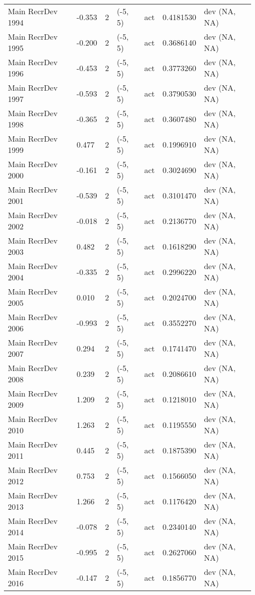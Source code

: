 \documentclass[11pt,
  english,
  letterpaper,
]{article}
\begin{document}
\begin{landscape}
\begin{longtable}[t]{>{\raggedright\arraybackslash}p{7cm}lllll>{\raggedright\arraybackslash}p{4cm}}
Main RecrDev 1994 & -0.353 & 2 & (-5, 5) & act & 0.4181530 & dev (NA, NA)\\
Main RecrDev 1995 & -0.200 & 2 & (-5, 5) & act & 0.3686140 & dev (NA, NA)\\
Main RecrDev 1996 & -0.453 & 2 & (-5, 5) & act & 0.3773260 & dev (NA, NA)\\
Main RecrDev 1997 & -0.593 & 2 & (-5, 5) & act & 0.3790530 & dev (NA, NA)\\
Main RecrDev 1998 & -0.365 & 2 & (-5, 5) & act & 0.3607480 & dev (NA, NA)\\
Main RecrDev 1999 & 0.477 & 2 & (-5, 5) & act & 0.1996910 & dev (NA, NA)\\
Main RecrDev 2000 & -0.161 & 2 & (-5, 5) & act & 0.3024690 & dev (NA, NA)\\
Main RecrDev 2001 & -0.539 & 2 & (-5, 5) & act & 0.3101470 & dev (NA, NA)\\
Main RecrDev 2002 & -0.018 & 2 & (-5, 5) & act & 0.2136770 & dev (NA, NA)\\
Main RecrDev 2003 & 0.482 & 2 & (-5, 5) & act & 0.1618290 & dev (NA, NA)\\
Main RecrDev 2004 & -0.335 & 2 & (-5, 5) & act & 0.2996220 & dev (NA, NA)\\
Main RecrDev 2005 & 0.010 & 2 & (-5, 5) & act & 0.2024700 & dev (NA, NA)\\
Main RecrDev 2006 & -0.993 & 2 & (-5, 5) & act & 0.3552270 & dev (NA, NA)\\
Main RecrDev 2007 & 0.294 & 2 & (-5, 5) & act & 0.1741470 & dev (NA, NA)\\
Main RecrDev 2008 & 0.239 & 2 & (-5, 5) & act & 0.2086610 & dev (NA, NA)\\
Main RecrDev 2009 & 1.209 & 2 & (-5, 5) & act & 0.1218010 & dev (NA, NA)\\
Main RecrDev 2010 & 1.263 & 2 & (-5, 5) & act & 0.1195550 & dev (NA, NA)\\
Main RecrDev 2011 & 0.445 & 2 & (-5, 5) & act & 0.1875390 & dev (NA, NA)\\
Main RecrDev 2012 & 0.753 & 2 & (-5, 5) & act & 0.1566050 & dev (NA, NA)\\
Main RecrDev 2013 & 1.266 & 2 & (-5, 5) & act & 0.1176420 & dev (NA, NA)\\
Main RecrDev 2014 & -0.078 & 2 & (-5, 5) & act & 0.2340140 & dev (NA, NA)\\
Main RecrDev 2015 & -0.995 & 2 & (-5, 5) & act & 0.2627060 & dev (NA, NA)\\
Main RecrDev 2016 & -0.147 & 2 & (-5, 5) & act & 0.1856770 & dev (NA, NA)\\

\end{longtable}
\end{landscape}
\end{document}
